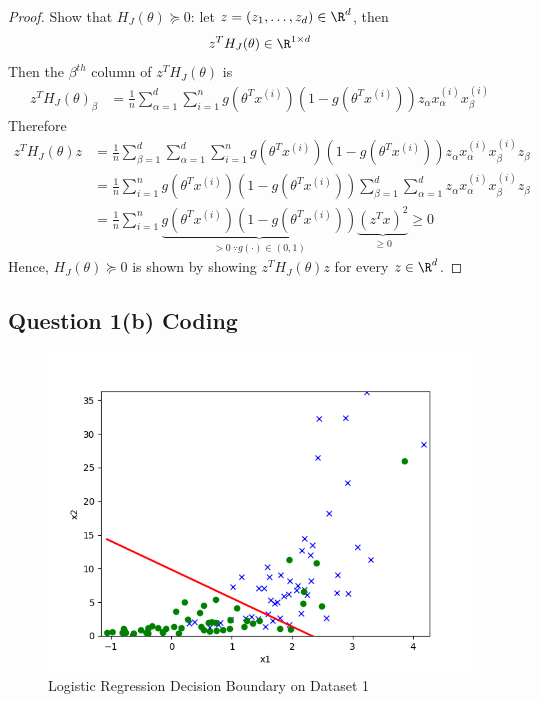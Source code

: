 \documentclass[11pt]{article}
\newcommand{\upi}[0]{^{(i)}}
\begin{document}
	\begin{proof} Show that $H_J (\theta) \succeq 0$: let $z = (z_1,\dots,z_d) \in \R^d$, then
		\begin{align}
			z^T H_J (\theta) \in \R^{1 \times d}
		\end{align}
		Then the $\beta^{th}$ column of $z^T H_J (\theta)$ is
		\begin{align}
			z^T H_J (\theta)_{\beta} &= \frac{1}{n} \sum_{\alpha=1}^d \sum_{i=1}^n g(\theta^T x\upi) (1-g(\theta^T x\upi)) z_\alpha x\upi_\alpha x\upi_\beta
		\end{align}
		Therefore
		\begin{align}
			z^T H_J(\theta) z &= \frac{1}{n} \sum_{\beta=1}^d \sum_{\alpha=1}^d \sum_{i=1}^n g(\theta^T x\upi) (1-g(\theta^T x\upi)) z_\alpha x\upi_\alpha x\upi_\beta z_\beta \\
			&= \frac{1}{n} \sum_{i=1}^n g(\theta^T x\upi) (1-g(\theta^T x\upi)) \sum_{\beta=1}^d \sum_{\alpha=1}^d z_\alpha x\upi_\alpha x\upi_\beta z_\beta \\
			&= \frac{1}{n} \sum_{i=1}^n \underbrace{g(\theta^T x\upi) (1-g(\theta^T x\upi))}_{> 0\ \because g(\cdot) \in (0, 1)} \underbrace{(z^T x)^2}_{\geq 0} \geq 0
		\end{align}
		Hence, $H_J(\theta) \succeq 0$ is shown by showing $z^T H_J(\theta) z$ for every $z \in \R^d$.
	\end{proof}
	
	\newpage
	\subsection{Question 1(b) Coding}
	\begin{figure}[h]
		\centering
		\includegraphics[width=0.6\linewidth]{src/linearclass/logreg_pred_1.png}
		\caption{Logistic Regression Decision Boundary on Dataset 1}
	\end{figure}
	
\end{document}
